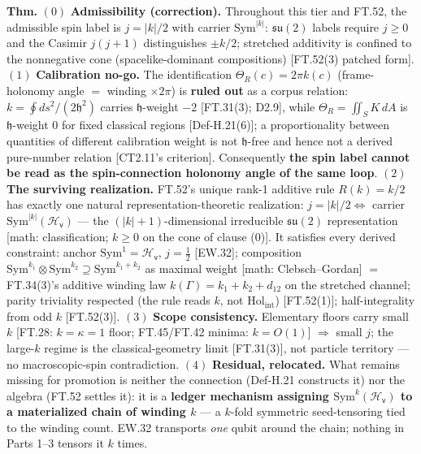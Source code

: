 \begin{theorem}\label{tag:FT-55}
\textbf{Thm.} $(0)$ \textbf{Admissibility (correction).} Throughout this tier and FT.52, the admissible spin label is $j=|k|/2$ with carrier $\mathrm{Sym}^{|k|}$: $\mathfrak{su}(2)$ labels require $j\ge0$ and the Casimir $j(j{+}1)$ distinguishes $\pm k/2$; stretched additivity is confined to the nonnegative cone (spacelike-dominant compositions) [FT.52(3) patched form]. $(1)$ \textbf{Calibration no-go.} The identification $\Theta_R(c)=2\pi k(c)$ (frame-holonomy angle $=$ winding $\times2\pi$) is \textbf{ruled out} as a corpus relation: $k=\oint ds^2/(2\mathfrak h^2)$ carries $\mathfrak h$-weight $-2$ [FT.31(3); D2.9], while $\Theta_R=\iint_S K\,dA$ is $\mathfrak h$-weight $0$ for fixed classical regions [Def-H.21(6)]; a proportionality between quantities of different calibration weight is not $\mathfrak h$-free and hence not a derived pure-number relation [CT2.11's criterion]. Consequently \textbf{the spin label cannot be read as the spin-connection holonomy angle of the same loop}. $(2)$ \textbf{The surviving realization.} FT.52's unique rank-1 additive rule $R(k)=k/2$ has exactly one natural representation-theoretic realization: $j=|k|/2\iff$ carrier $\mathrm{Sym}^{|k|}(\mathcal H_{\mathsf v})$ — the $(|k|{+}1)$-dimensional irreducible $\mathfrak{su}(2)$ representation [math: classification; $k\ge0$ on the cone of clause (0)]. It satisfies every derived constraint: anchor $\mathrm{Sym}^1=\mathcal H_{\mathsf v}$, $j=\tfrac12$ [EW.32]; composition $\mathrm{Sym}^{k_1}\otimes\mathrm{Sym}^{k_2}\supseteq\mathrm{Sym}^{k_1+k_2}$ as maximal weight [math: Clebsch–Gordan] $=$ FT.34(3)'s additive winding law $k(\Gamma)=k_1+k_2+d_{12}$ on the stretched channel; parity triviality respected (the rule reads $k$, not $\mathrm{Hol}_{\mathrm{int}}$) [FT.52(1)]; half-integrality from odd $k$ [FT.52(3)]. $(3)$ \textbf{Scope consistency.} Elementary floors carry small $k$ [FT.28: $k=\kappa=1$ floor; FT.45/FT.42 minima: $k=O(1)$] $\Rightarrow$ small $j$; the large-$k$ regime is the classical-geometry limit [FT.31(3)], not particle territory — no macroscopic-spin contradiction. $(4)$ \textbf{Residual, relocated.} What remains missing for promotion is neither the connection (Def-H.21 constructs it) nor the algebra (FT.52 settles it): it is a \textbf{ledger mechanism assigning $\mathrm{Sym}^k(\mathcal H_{\mathsf v})$ to a materialized chain of winding $k$} — a $k$-fold symmetric seed-tensoring tied to the winding count. EW.32 transports \textit{one} qubit around the chain; nothing in Parts 1–3 tensors it $k$ times.


\end{theorem}
